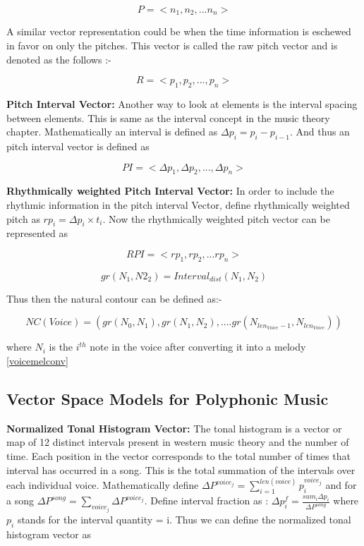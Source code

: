\begin{equation}
P = <n_1, n_2, ... n_n>
\end{equation}

\noindent A similar vector representation could be when the time information is eschewed in favor on only the pitches. This vector is called the raw pitch vector and is denoted as the follows :-

\begin{equation} \label{eq:rawpitch}
R = <p_1, p_2, ..., p_n>
\end{equation}

\noindent \textbf{Pitch Interval Vector:} Another way to look at elements is the interval spacing between elements. This is same as the interval concept in the music theory chapter. Mathematically an interval is defined as $\Delta p_i = p_i - p_{i-1}$. And thus an pitch interval vector is defined as

\begin{equation}
PI = <\Delta p_1, \Delta p_2, ... , \Delta p_n>
\end{equation}

\noindent \textbf{Rhythmically weighted Pitch Interval Vector:} In order to include the rhythmic information in the pitch interval Vector, define rhythmically weighted pitch as $rp_i = \Delta p_i \times t_i$. Now the rhythmically weighted pitch vector can be represented as

\begin{equation}
RPI = <rp_1, rp_2, ... rp_n>
\end{equation}

\begin{equation}
gr(N_1, N2_2) = Interval_{dist}(N_1, N_2)
\end{equation}

Thus then the natural contour can be defined as:-

\begin{equation}
NC(Voice) = (gr(N_0, N_1), gr(N_1, N_2), .... gr(N_{len_{Voice} - 1}, N_{len_{Voice}}))
\end{equation}

where $N_i$ is the $i^{th}$ note in the voice after converting it into a melody \ref{voicemelconv}

\subsection{Vector Space Models for Polyphonic Music} 

\noindent \textbf{Normalized Tonal Histogram Vector:} The tonal histogram is a vector or map of 12 distinct intervals present in western music theory and the number of time. Each position in the vector corresponds to the total number of times that interval has occurred in a song. This is the total summation of the intervals over each individual voice. Mathematically define $\Delta P^{voice_j} = \sum_{i=1}^{len(voice)} p_i^{voice_j}$ and for a song $\Delta P^{song} = \sum_{voice_j} \Delta P^{voice_j}$. Define interval fraction as : $\Delta p^f_i = \frac{sum_i \Delta p_i}{\Delta P^{song}}$ where $p_i$ stands for the interval quantity = i. Thus we can define the normalized tonal histogram vector as


